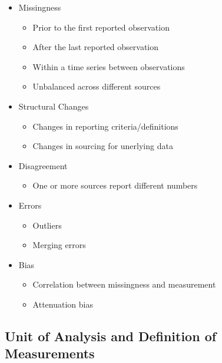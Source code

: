 \documentclass[
]{book}
\providecommand{\tightlist}{%
  \setlength{\itemsep}{0pt}\setlength{\parskip}{0pt}}
\begin{document}
\begin{itemize}
\tightlist
\item
  Missingness

  \begin{itemize}
  \tightlist
  \item
    Prior to the first reported observation
  \item
    After the last reported observation
  \item
    Within a time series between observations
  \item
    Unbalanced across different sources
  \end{itemize}
\item
  Structural Changes

  \begin{itemize}
  \tightlist
  \item
    Changes in reporting criteria/definitions
  \item
    Changes in sourcing for unerlying data
  \end{itemize}
\item
  Disagreement

  \begin{itemize}
  \tightlist
  \item
    One or more sources report different numbers
  \end{itemize}
\item
  Errors

  \begin{itemize}
  \tightlist
  \item
    Outliers
  \item
    Merging errors
  \end{itemize}
\item
  Bias

  \begin{itemize}
  \tightlist
  \item
    Correlation between missingness and measurement
  \item
    Attenuation bias
  \end{itemize}
\end{itemize}

\hypertarget{unit-of-analysis-and-definition-of-measurements}{%
\subsection{Unit of Analysis and Definition of Measurements}\label{unit-of-analysis-and-definition-of-measurements}}
\end{document}
